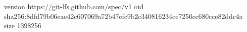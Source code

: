 version https://git-lfs.github.com/spec/v1
oid sha256:8dfd79b06cae42c607069a72b47efc9b2c340816234ce7250ec680cce82ddc4a
size 1398256
